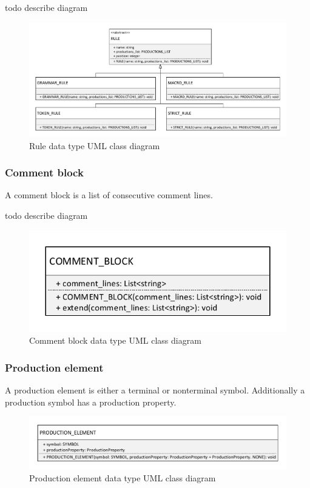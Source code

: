 todo describe diagram
\begin{figure}[H]
\centering
\includegraphics[width=1\textwidth]{images/Concept_uml_data_types_rules.pdf}
\caption{Rule data type UML class diagram}
\label{fig:ConceptRulesClassDiagram}
\end{figure}

\subsubsection{Comment block}
A comment block is a list of consecutive comment lines.

todo describe diagram
\begin{figure}[H]
\centering
\includegraphics[width=.5\textwidth]{images/Concept_uml_data_types_comment_block.pdf}
\caption{Comment block data type UML class diagram}
\label{fig:ConceptCommentBlockClassDiagram}
\end{figure}

\subsubsection{Production element}
A production element is either a terminal or nonterminal symbol. Additionally a production symbol has a production property.
\begin{figure}[H]
\centering
\includegraphics[width=.8\textwidth]{images/Concept_uml_data_types_production_element.pdf}
\caption{Production element data type UML class diagram}
\label{fig:ConceptProductionElementClassDiagram}
\end{figure}


